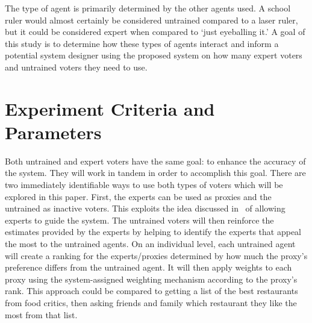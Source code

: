The type of agent is primarily determined by the other agents used.
A school ruler would almost certainly be considered untrained compared to a laser ruler,
but it could be considered expert when compared to `just eyeballing it.'
A goal of this study is to determine how these types of
agents interact and inform a potential system designer using the proposed system on
how many expert voters and untrained voters they need to use.

\section{Experiment Criteria and Parameters}
\label{sec:experiment-criteria-and-parameters}
Both untrained and expert voters have the same goal: to enhance the accuracy of
the system.
They will work in tandem in order to accomplish this goal.
There are two immediately identifiable ways to use both types of voters which
will be explored in this paper.
First, the experts can be used as proxies and the untrained as inactive voters.
This exploits the idea discussed in~\cite{Miller1969, Mueller1972} of
allowing experts to guide the system.
The untrained voters will then reinforce the estimates provided by the experts by
helping to identify the experts that appeal the most to the untrained agents.
On an individual level, each untrained agent will create a ranking for the
experts/proxies determined by how much the proxy's preference differs from the
untrained agent.
It will then apply weights to each proxy using the system-assigned weighting mechanism
according to the proxy's rank.
This approach could be compared to getting a list of the best restaurants from food
critics, then asking friends and family which restaurant they like the most from
that list.

